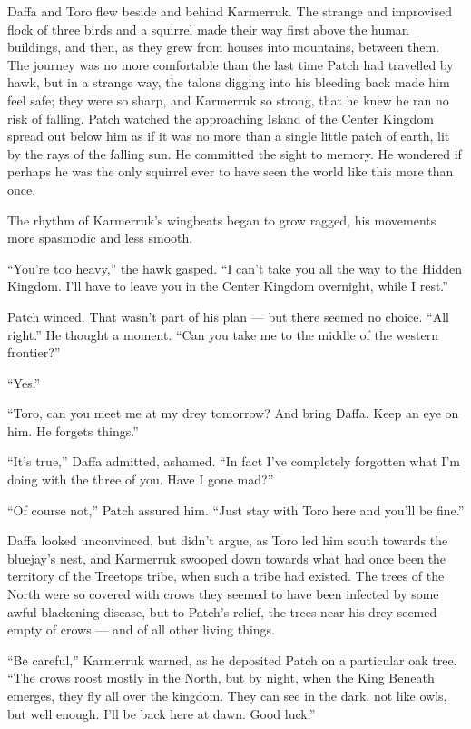 \documentclass[ebook,oneside,openany,17pt]{memoir}
\newenvironment{tolerant}[1]{%
  \par\tolerance=#1\relax
}{%
  \par
}
\begin{document}
Daffa and Toro flew beside and behind Karmerruk. The strange and
improvised flock of three birds and a squirrel made their way first
above the human buildings, and then, as they grew from houses into
mountains, between them. The journey was no more comfortable than the
last time Patch had travelled by hawk, but in a strange way, the
talons digging into his bleeding back made him feel safe; they were so
sharp, and Karmerruk so strong, that he knew he ran no risk of
falling. Patch watched the approaching Island of the Center Kingdom
spread out below him as if it was no more than a single little patch
of earth, lit by the rays of the falling sun. He committed the sight
to memory. He wondered if perhaps he was the only squirrel ever to
have seen the world like this more than once.

The rhythm of Karmerruk’s wingbeats began to grow ragged, his
movements more spasmodic and less smooth.

“You’re too heavy,” the hawk gasped. “I can’t take you all the way to
the Hidden Kingdom. I’ll have to leave you in the Center Kingdom
overnight, while I rest.”

Patch winced. That wasn’t part of his plan — but there seemed no
choice. “All right.” He thought a moment. “Can you take me to the
middle of the western frontier?”

“Yes.”

“Toro, can you meet me at my drey tomorrow? And bring Daffa. Keep an
eye on him. He forgets things.”

“It’s true,” Daffa admitted, ashamed. “In fact I’ve completely
forgotten what I’m doing with the three of you. Have I gone mad?”

“Of course not,” Patch assured him. “Just stay with Toro here and
you’ll be fine.”

Daffa looked unconvinced, but didn’t argue, as Toro led him south
towards the bluejay’s nest, and Karmerruk swooped down towards what
had once been the territory of the Treetops tribe, when such a tribe
had existed. The trees of the North were so covered with crows they
seemed to have been infected by some awful blackening disease, but to
Patch’s relief, the trees near his drey seemed empty of crows — and of
all other living things.

\begin{tolerant}{500}
“Be careful,” Karmerruk warned, as he deposited Patch on a particular
oak tree. “The crows roost most\-ly in the North, but by night, when the
King Beneath emerges, they fly all over the kingdom. They can see in
the dark, not like owls, but well enough. I’ll be back here at
dawn. Good luck.”
\end{tolerant}
\end{document}
